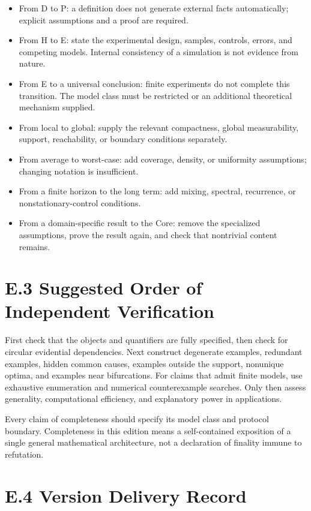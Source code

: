 \documentclass[
  english,
  11pt,
  oneside]{book}
\providecommand{\tightlist}{%
  \setlength{\itemsep}{0pt}\setlength{\parskip}{0pt}}
\begin{document}
\begin{itemize}
\tightlist
\item
  From D to P: a definition does not generate external facts automatically; explicit assumptions and a proof are required.
\item
  From H to E: state the experimental design, samples, controls, errors, and competing models. Internal consistency of a simulation is not evidence from nature.
\item
  From E to a universal conclusion: finite experiments do not complete this transition. The model class must be restricted or an additional theoretical mechanism supplied.
\item
  From local to global: supply the relevant compactness, global measurability, support, reachability, or boundary conditions separately.
\item
  From average to worst-case: add coverage, density, or uniformity assumptions; changing notation is insufficient.
\item
  From a finite horizon to the long term: add mixing, spectral, recurrence, or nonstationary-control conditions.
\item
  From a domain-specific result to the Core: remove the specialized assumptions, prove the result again, and check that nontrivial content remains.
\end{itemize}

\section{E.3 Suggested Order of Independent Verification}\label{e.3-suggested-order-of-independent-verification}

First check that the objects and quantifiers are fully specified, then check for circular evidential dependencies. Next construct degenerate examples, redundant examples, hidden common causes, examples outside the support, nonunique optima, and examples near bifurcations. For claims that admit finite models, use exhaustive enumeration and numerical counterexample searches. Only then assess generality, computational efficiency, and explanatory power in applications.

Every claim of completeness should specify its model class and protocol boundary. Completeness in this edition means a self-contained exposition of a single general mathematical architecture, not a declaration of finality immune to refutation.

\section{E.4 Version Delivery Record}\label{e.4-version-delivery-record}
\end{document}
